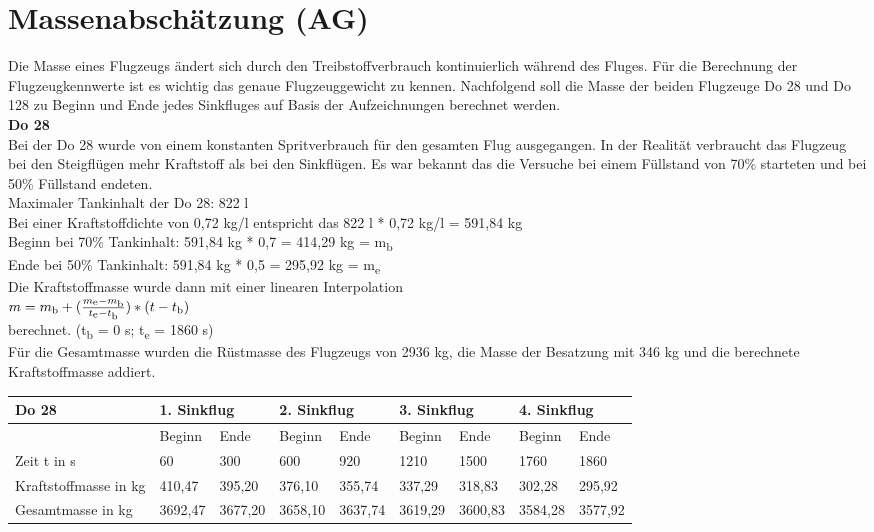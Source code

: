 \chapter{Massenabschätzung (AG)}
\label{c:Mabsch}
Die Masse eines Flugzeugs ändert sich durch den Treibstoffverbrauch kontinuierlich während des Fluges. Für die Berechnung der Flugzeugkennwerte ist es wichtig das genaue Flugzeuggewicht zu kennen. Nachfolgend soll die Masse der beiden Flugzeuge Do 28 und Do 128 zu Beginn und Ende jedes Sinkfluges auf Basis der Aufzeichnungen berechnet werden. \\
\textbf{Do 28}\\
Bei der Do 28 wurde von einem konstanten Spritverbrauch für den gesamten Flug ausgegangen. In der Realität verbraucht das Flugzeug bei den Steigflügen mehr Kraftstoff als bei den Sinkflügen. Es war bekannt das die Versuche bei einem Füllstand von 70\% starteten und bei 50\% Füllstand endeten.\\
Maximaler Tankinhalt der Do 28: 822 l\\
Bei einer Kraftstoffdichte von 0,72 kg/l entspricht das 822 l * 0,72 kg/l = 591,84 kg\\
Beginn bei 70\% Tankinhalt: 591,84 kg * 0,7 = 414,29 kg = m\textsubscript{b}\\
Ende bei 50\% Tankinhalt: 591,84 kg * 0,5 = 295,92 kg = m\textsubscript{e}\\
Die Kraftstoffmasse wurde dann mit einer linearen Interpolation \\
$m=m\textsubscript{b}+(\frac{m\textsubscript{e}-m\textsubscript{b}}{t\textsubscript{e}-t\textsubscript{b}})*(t-t\textsubscript{b})$\\
berechnet. (t\textsubscript{b} = 0 s; t\textsubscript{e} = 1860 s)\\
Für die Gesamtmasse wurden die Rüstmasse des Flugzeugs von 2936 kg, die Masse der Besatzung mit 346 kg und die berechnete Kraftstoffmasse addiert. 

\begin{table}[h]
\begin{tabular}{|l|l|l|l|l|l|l|l|l|}
\hline
Do 28                 & \multicolumn{2}{l|}{1. Sinkflug} & \multicolumn{2}{l|}{2. Sinkflug} & \multicolumn{2}{l|}{3. Sinkflug} & \multicolumn{2}{l|}{4. Sinkflug} \\ \hline
                      & Beginn          & Ende           & Beginn          & Ende           & Beginn          & Ende           & Beginn          & Ende           \\ \hline
Zeit t in s           & 60              & 300            & 600             & 920            & 1210            & 1500           & 1760            & 1860           \\ \hline
Kraftstoffmasse in kg & 410,47          & 395,20         & 376,10          & 355,74         & 337,29          & 318,83         & 302,28          & 295,92         \\ \hline
Gesamtmasse in kg     & 3692,47         & 3677,20        & 3658,10         & 3637,74        & 3619,29         & 3600,83        & 3584,28         & 3577,92        \\ \hline
\end{tabular}
\end{table}

